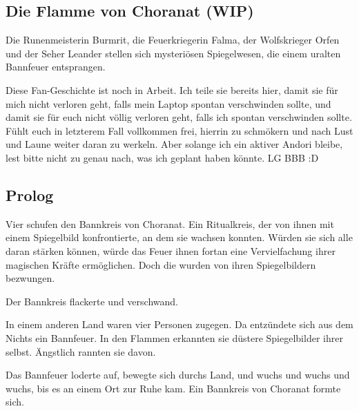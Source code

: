 \begin{chapterbox}
    \chapter{Die Flamme von Choranat (WIP)}
    \label{wip-die-flamme-von-choranat}

    Die Runenmeisterin Burmrit, die Feuerkriegerin Falma, der Wolfskrieger Orfen und der Seher Leander stellen sich mysteriösen Spiegelwesen, die einem uralten Bannfeuer entsprangen.
\end{chapterbox}



Diese Fan-Geschichte ist noch in Arbeit. Ich teile sie bereits hier, damit sie für mich nicht verloren geht, falls mein Laptop spontan verschwinden sollte, und damit sie für euch nicht völlig verloren geht, falls ich spontan verschwinden sollte. Fühlt euch in letzterem Fall vollkommen frei, hierrin zu schmökern und nach Lust und Laune weiter daran zu werkeln. Aber solange ich ein aktiver Andori bleibe, lest bitte nicht zu genau nach, was ich geplant haben könnte. LG BBB :D





\newpage
\section{Prolog}

Vier  schufen den Bannkreis von Choranat. Ein Ritualkreis, der  von ihnen mit einem Spiegelbild konfrontierte, an dem sie wachsen konnten. Würden sie sich alle daran stärken können, würde das Feuer ihnen fortan eine Vervielfachung ihrer magischen Kräfte ermöglichen. Doch die  wurden von ihren Spiegelbildern bezwungen. 

Der Bannkreis flackerte und verschwand.




In einem anderen Land waren vier Personen zugegen. Da entzündete sich aus dem Nichts ein Bannfeuer. In den Flammen erkannten sie düstere Spiegelbilder ihrer selbst. Ängstlich rannten sie davon.

Das Bannfeuer loderte auf, bewegte sich durchs Land, und wuchs und wuchs und wuchs, bis es an einem Ort zur Ruhe kam. Ein Bannkreis von Choranat formte sich.









